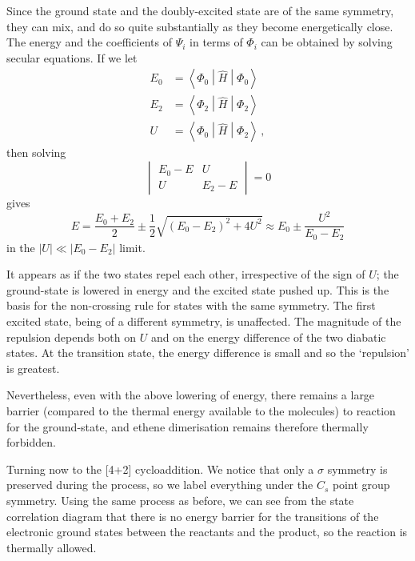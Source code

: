 \documentclass{article}
\theoremstyle{plain}\theoremheaderfont{\normalfont\itshape}\theorembodyfont{\rmfamily}\theoremseparator{.}\newtheorem*{rem}{Remark}\newtheorem*{ex}{Example}\newtheorem*{proof}{Proof}\newtheorem*{altp}{Alternative proof}
\theoremstyle{plain}\theoremheaderfont{\normalfont\bfseries}\theorembodyfont{\rmfamily}\theoremseparator{.}\newtheorem{thm}{Theorem}[section]\newtheorem{lem}[thm]{Lemma}\newtheorem{prop}[thm]{Proposition}\newtheorem*{cor}{Corollary}\newtheorem{defn}[thm]{Definition}\newtheorem{clm}[thm]{Claim}\newtheorem{clminproof}{Claim}\newtheorem{pos}{Postulate}[section]
\theoremstyle{break}\theoremheaderfont{\normalfont\itshape}\theorembodyfont{\rmfamily}\theoremseparator{.\medskip}\newtheorem*{proofskip}{Proof}\newtheorem*{exs}{Examples}\newtheorem*{rems}{Remarks}
\theoremstyle{break}\theoremheaderfont{\normalfont\bfseries}\theorembodyfont{\rmfamily}\theoremseparator{.\medskip}\newtheorem{lemskip}[thm]{Lemma}\newtheorem{defnskip}[thm]{Definition}\newtheorem{propskip}[thm]{Proposition}\newtheorem{thmskip}[thm]{Theorem}
\numberwithin{equation}{section}
\newcommand{\expval}[2]{\left\langle #2 \middle| #1 \middle| #2 \right\rangle}
\newcommand{\mel}[3]{\left\langle #1 \middle| #2 \middle| #3 \right\rangle}
\newcommand{\abs}[1]{\left| #1 \right|}
\begin{document}
    Since the ground state and the doubly-excited state are of the same symmetry, they can mix, and do so quite substantially as they become energetically close. The energy and the coefficients of \(\Psi_i\) in terms of \(\Phi_i\) can be obtained by solving secular equations. If we let
    \begin{equation}
        \begin{aligned}
            E_0&=\expval{\hat{H}}{\Phi_0}\\
            E_2&=\expval{\hat{H}}{\Phi_2}\\
            U&=\mel{\Phi_0}{\hat{H}}{\Phi_2}\,,
        \end{aligned}
    \end{equation}
    then solving
    \begin{equation}
        \begin{vmatrix}
            E_0-E & U \\
            U & E_2-E
        \end{vmatrix}=0
    \end{equation}
    gives
    \begin{equation}
        E=\frac{E_0+E_2}{2}\pm\frac{1}{2}\sqrt{(E_0-E_2)^2+4U^2}\approx E_0\pm\frac{U^2}{E_0-E_2}
    \end{equation}
    in the \(\abs{U}\ll\abs{E_0-E_2}\) limit.

    It appears as if the two states repel each other, irrespective of the sign of \(U\); the ground-state is lowered in energy and the excited state pushed up. This is the basis for the non-crossing rule for states with the same symmetry. The first excited state, being of a different symmetry, is unaffected. The magnitude of the repulsion depends both on \(U\) and on the energy difference of the two diabatic states. At the transition state, the energy difference is small and so the `repulsion' is greatest.

    Nevertheless, even with the above lowering of energy, there remains a large barrier (compared to the thermal energy available to the molecules) to reaction for the ground-state, and ethene dimerisation remains therefore thermally forbidden.

    Turning now to the [4+2] cycloaddition. We notice that only a \(\sigma\) symmetry is preserved during the process, so we label everything under the \(C_s\) point group symmetry. Using the same process as before, we can see from the state correlation diagram that there is no energy barrier for the transitions of the electronic ground states between the reactants and the product, so the reaction is thermally allowed.
\end{document}
